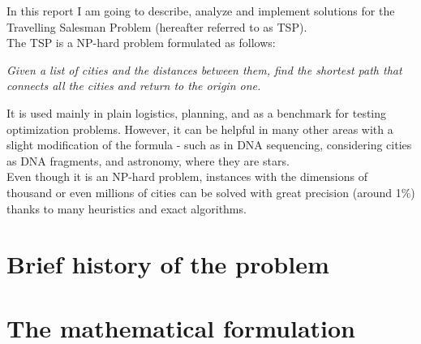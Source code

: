 In this report I am going to describe, analyze and implement solutions for the Travelling Salesman Problem (hereafter referred to as TSP).\\
The TSP is a NP-hard problem formulated as follows:
\begin{displayquote}
	\textit{Given a list of cities and the distances between them, find the shortest path that connects all the cities and return to the origin one.}
\end{displayquote}
It is used mainly in plain logistics, planning, and as a benchmark for
testing optimization problems. However, it can be helpful in many other
areas with a slight modification of the formula - such as in DNA sequencing,
considering cities as DNA fragments, and astronomy, where they are stars.\\
Even though it is an NP-hard problem, instances with the dimensions of thousand or even millions of cities can be solved  with great precision (around 1\%) thanks to many heuristics and exact algorithms.

\section{Brief history of the problem}


\section{The mathematical formulation}
\label{chapter:mat_formulation}
